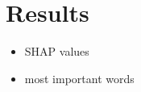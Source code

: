 \section{Results}


\begin{itemize}[noitemsep]
	\item SHAP values
	\item most important words
\end{itemize}